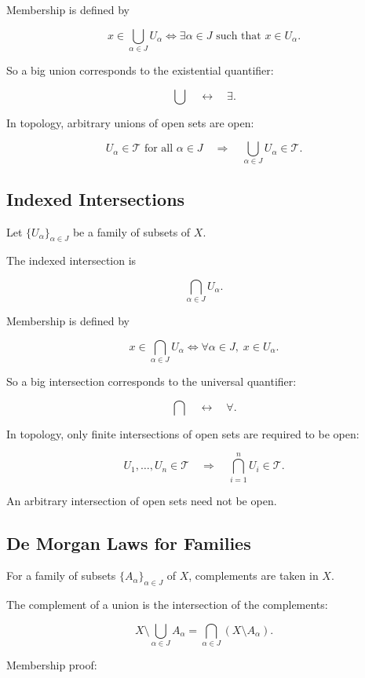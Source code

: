 \documentclass{article}
\begin{document}
	Membership is defined by
	
	$$
	x\in\bigcup_{\alpha\in J}U_\alpha
	\iff
	\exists \alpha\in J \text{ such that } x\in U_\alpha.
	$$
	
	So a big union corresponds to the existential quantifier:
	
	$$
	\bigcup \quad \leftrightarrow \quad \exists.
	$$
	
	In topology, arbitrary unions of open sets are open:
	
	$$
	U_\alpha\in\mathcal{T}\text{ for all }\alpha\in J
	\quad\Rightarrow\quad
	\bigcup_{\alpha\in J}U_\alpha\in\mathcal{T}.
	$$
	
	\subsection{Indexed Intersections}
	
	Let \(\{U_\alpha\}_{\alpha\in J}\) be a family of subsets of \(X\).
	
	The indexed intersection is
	
	$$
	\bigcap_{\alpha\in J}U_\alpha.
	$$
	
	Membership is defined by
	
	$$
	x\in\bigcap_{\alpha\in J}U_\alpha
	\iff
	\forall \alpha\in J,\; x\in U_\alpha.
	$$
	
	So a big intersection corresponds to the universal quantifier:
	
	$$
	\bigcap \quad \leftrightarrow \quad \forall.
	$$
	
	In topology, only finite intersections of open sets are required to be open:
	
	$$
	U_1,\ldots,U_n\in\mathcal{T}
	\quad\Rightarrow\quad
	\bigcap_{i=1}^{n}U_i\in\mathcal{T}.
	$$
	
	An arbitrary intersection of open sets need not be open.
	
	\subsection{De Morgan Laws for Families}
	
	For a family of subsets \(\{A_\alpha\}_{\alpha\in J}\) of \(X\), complements are taken in \(X\).
	
	The complement of a union is the intersection of the complements:
	
	$$
	X\setminus\bigcup_{\alpha\in J}A_\alpha
	=
	\bigcap_{\alpha\in J}(X\setminus A_\alpha).
	$$
	
	Membership proof:
	
\end{document}

